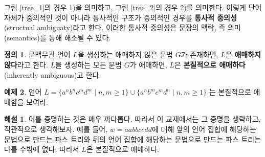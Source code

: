 \documentclass[b5paper, 11pt]{book}
\theoremstyle{definition}
\newtheorem{defn}{정의}[chapter]
\newtheorem{ex}[defn]{예제}
\newtheorem*{ans*}{해설}
\begin{document}
그림 \ref{tree_1}의 경우 1)을 의미하고, 그림 \ref{tree_2}의 경우 2)를 의미한다. 
이렇게 단어 자체가 중의적인 것이 아니라
통사적인 구조가 중의적인 경우를 \textbf{통사적 중의성}(structual ambiguaty)라고 한다. 
이러한 통사적 중의성은 문장의 맥락, 즉 의미(semantics)를 통해 해소될 수 있다.
\begin{defn}
    문맥무관 언어 $L$을 생성하는 애매하지 않은 문법 $G$가 존재하면, $L$은 
    \textbf{애매하지 않다}라고 한다. $L$을 생성하는 모든 문법 $G$가 애매하면,
    $L$은 \textbf{본질적으로 애매하다}(inherently ambiguous)고 한다.
\end{defn} 
\begin{ex}
    언어 $L = \{a^nb^nc^md^m \; \vert \; n,m \ge 1\} \cup \{a^nb^mc^md^n \; \vert \; n,m \ge 1\}$
    는 본질적으로 애매함을 보여라.
\end{ex}
\begin{ans*}
    이를 증명하는 것은 매우 까다롭다. 따라서 이 교재에서는 그 증명을 생략하고, 직관적으로 생각해보자. 예를 들어, $w = aabbccdd$에 대해 앞의 언어 집합에 해당하는 문법으로 만드는 파스 트리와 뒤의 언어 집합에 해당하는 문법으로 만드는 파스 트리는 다를 수밖에 없다. 따라서 $L$은 본질적으로 애매하다.
\end{ans*}
\end{document}
